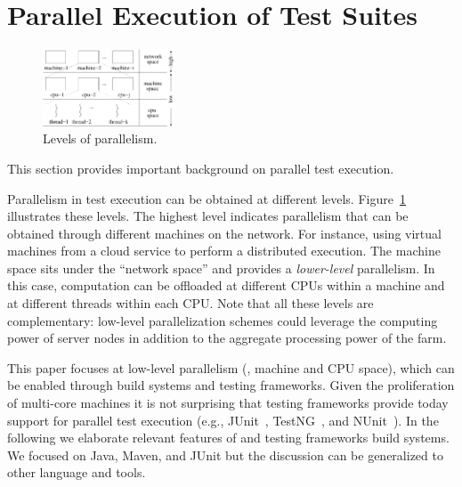 \newcommand{\Seq}{C0}
\newcommand{\SeqClassParMeth}{C1}
\newcommand{\ParClassSeqMeth}{C2}
\newcommand{\ParClassParMeth}{C3}
\newcommand{\Fork}{F}
\newcommand{\ForkSeq}{\Fork{}\Seq{}}
\newcommand{\ForkParMeth}{\Fork{}\SeqClassParMeth{}}

\section{Parallel Execution of Test Suites}
\label{sec:modes}

\begin{figure}[t!]
  \centering
  \includegraphics[width=0.35\textwidth]{figs/parallel-levels.pdf}
  \vspace{-1ex}
  \caption{\label{fig:levels}Levels of parallelism.}
\end{figure}

This section provides important background on parallel test execution.

Parallelism in test execution can be obtained at different levels.
Figure~\ref{fig:levels} illustrates these levels.  The highest
level indicates parallelism that can be obtained through different
machines on the network.  For instance, using virtual machines from a
cloud service to perform a distributed execution.  The machine space
sits under the ``network space'' and provides a \emph{lower-level}
parallelism.  In this case, computation can be offloaded at different
CPUs within a machine and at different threads within each CPU.  Note
that all these levels are complementary:  low-level parallelization
schemes could leverage the computing power of server nodes in addition
to the aggregate processing power of the farm.

This paper focuses at low-level parallelism (\ie, machine and CPU
space), which can be enabled through build systems and testing
frameworks.  Given the proliferation of multi-core machines it is not
surprising that testing frameworks provide today support for parallel
test execution (e.g., JUnit~\cite{junit-org}, TestNG~\cite{testng},
and NUnit~\cite{nunit}).  In the following we elaborate relevant
features of and testing frameworks build systems.  We focused on Java,
Maven, and JUnit but the discussion can be generalized to other
language and tools.

